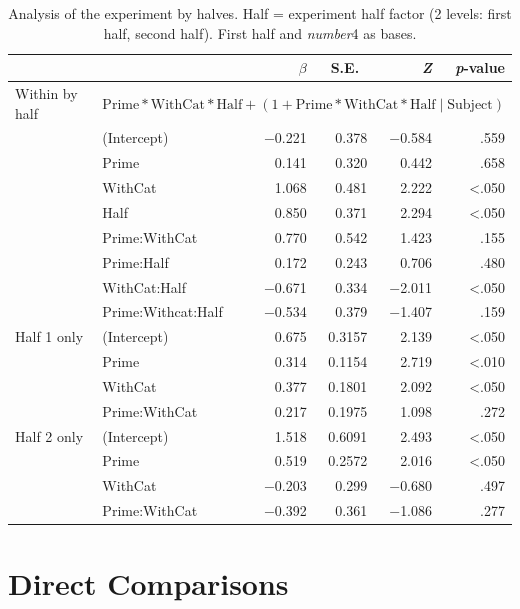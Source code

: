 \documentclass[10pt]{article}
\begin{document}
\begin{table}[h]
  \centering
  \begin{tabular}{llrrrr}
    \hline
     & & \(\beta\) & S.E.\ & \emph{Z} & \emph{p}-value  \\
    \hline
    Within by half & \multicolumn{5}{l}{\(\text{Prime} * \text{WithCat} * \text{Half} + (1 + \text{Prime} * \text{WithCat} * \text{Half} \mid \text{Subject})\)}  \\
    & (Intercept)        & \(-\)0.221 & 0.378 & \(-\)0.584 & .559 \\
    & Prime              &  0.141 & 0.320 &  0.442 & .658 \\
    & WithCat            &  1.068 & 0.481 &  2.222 & <.050 \\
    & Half               &  0.850 & 0.371 &  2.294 & <.050 \\
    & Prime:WithCat      &  0.770 & 0.542 &  1.423 & .155 \\
    & Prime:Half         &  0.172 & 0.243 &  0.706 & .480 \\
    & WithCat:Half       & \(-\)0.671 & 0.334 & \(-\)2.011 & <.050 \\
    & Prime:Withcat:Half & \(-\)0.534 & 0.379 & \(-\)1.407 & .159 \\
    Half 1 only & (Intercept)   & 0.675 & 0.3157 & 2.139 & <.050 \\
                & Prime         & 0.314 & 0.1154 & 2.719 & <.010 \\
                & WithCat       & 0.377 & 0.1801 & 2.092 & <.050 \\
                & Prime:WithCat & 0.217 & 0.1975 & 1.098 & .272 \\
    Half 2 only & (Intercept)   & 1.518 & 0.6091 & 2.493 & <.050 \\
                & Prime         & 0.519 & 0.2572 & 2.016 & <.050 \\
                & WithCat       & \(-\)0.203& 0.299 & \(-\)0.680& .497 \\
                & Prime:WithCat & \(-\)0.392& 0.361 & \(-\)1.086& .277 \\
    \hline
  \end{tabular}\vspace{-7pt}
  \caption{Analysis of the experiment by halves. Half = experiment half factor (2 levels: first half, second half). First half and \emph{number}4 as bases.}
  \label{tab:halves}
\end{table}

\newpage
\section{Direct Comparisons}
\label{sec:direct-comparisons}
\end{document}

